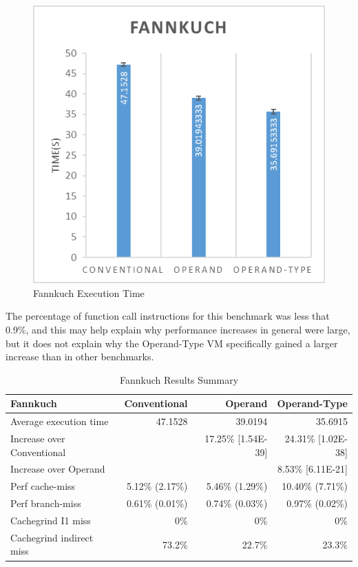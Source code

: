 \documentclass[english,a4paper,12pt]{report}
\begin{document}
\begin{figure}[!htb]
  \centering
  \includegraphics{fannkuch.png}
  \caption{Fannkuch Execution Time}
  \label{fig:fannkuch-time}
\end{figure}

The percentage of function call instructions for this benchmark was
less that 0.9\%, and this may help explain why performance increases
in general were large, but it does not explain why the Operand-Type VM
specifically gained a larger increase than in other benchmarks.

\begin{table}[!htb]
  \begin{center}
    \begin{tabular}{lrrr}
      Fannkuch & Conventional & Operand & Operand-Type\\
      \hline
      Average execution time & 47.1528 & 39.0194 & 35.6915\\
      Increase over Conventional &  & 17.25\% [1.54E-39] & 24.31\% [1.02E-38]\\
      Increase over Operand &  &  & 8.53\% [6.11E-21]\\
      Perf cache-miss & 5.12\% (2.17\%) & 5.46\% (1.29\%) & 10.40\% (7.71\%)\\
      Perf branch-miss & 0.61\% (0.01\%) & 0.74\% (0.03\%) & 0.97\% (0.02\%)\\
      Cachegrind I1 miss & 0\% & 0\% & 0\%\\
      Cachegrind indirect miss & 73.2\% & 22.7\% & 23.3\%\\
    \end{tabular}
  \end{center}
  \caption{Fannkuch Results Summary}
\end{table}
\end{document}
